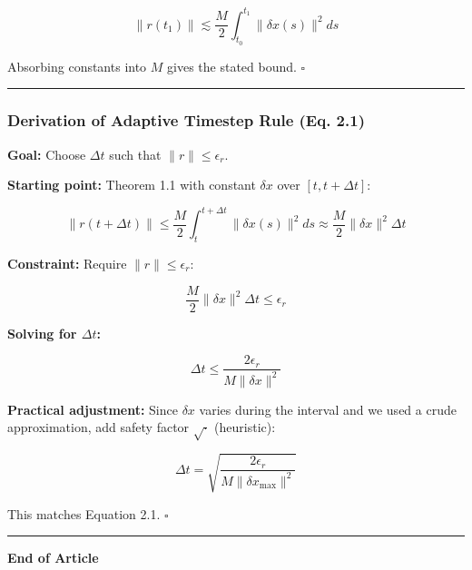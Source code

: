 \documentclass[
  letterpaper,
  DIV=11,
  numbers=noendperiod]{scrartcl}
\begin{document}
\[
\|r(t_1)\| \lesssim \frac{M}{2} \int_{t_0}^{t_1} \|\delta x(s)\|^2 ds
\]

Absorbing constants into \(M\) gives the stated bound. \(\square\)

\begin{center}\rule{0.5\linewidth}{0.5pt}\end{center}

\subsubsection{Derivation of Adaptive Timestep Rule (Eq.
2.1)}\label{derivation-of-adaptive-timestep-rule-eq.-2.1}

\textbf{Goal:} Choose \(\Delta t\) such that \(\|r\| \leq \epsilon_r\).

\textbf{Starting point:} Theorem 1.1 with constant \(\delta x\) over
\([t, t+\Delta t]\):

\[
\|r(t + \Delta t)\| \leq \frac{M}{2} \int_t^{t+\Delta t} \|\delta x(s)\|^2 ds \approx \frac{M}{2} \|\delta x\|^2 \Delta t
\]

\textbf{Constraint:} Require \(\|r\| \leq \epsilon_r\):

\[
\frac{M}{2} \|\delta x\|^2 \Delta t \leq \epsilon_r
\]

\textbf{Solving for \(\Delta t\):}

\[
\Delta t \leq \frac{2\epsilon_r}{M \|\delta x\|^2}
\]

\textbf{Practical adjustment:} Since \(\delta x\) varies during the
interval and we used a crude approximation, add safety factor
\(\sqrt{\cdot}\) (heuristic):

\[
\Delta t = \sqrt{\frac{2\epsilon_r}{M \|\delta x_{\max}\|^2}}
\]

This matches Equation 2.1. \(\square\)

\begin{center}\rule{0.5\linewidth}{0.5pt}\end{center}

\textbf{End of Article}
\end{document}
